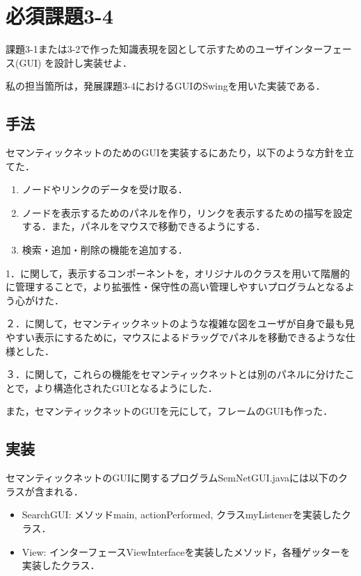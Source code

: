 \documentclass[12pt]{jarticle}
\begin{document}
\section{必須課題3-4}
\begin{screen}
課題3-1または3-2で作った知識表現を図として示すためのユーザインターフェース(GUI) を設計し実装せよ．
\end{screen}
私の担当箇所は，発展課題3-4におけるGUIのSwingを用いた実装である．

\subsection{手法}
セマンティックネットのためのGUIを実装するにあたり，以下のような方針を立てた．
\begin{enumerate}
\item ノードやリンクのデータを受け取る．
\item ノードを表示するためのパネルを作り，リンクを表示するための描写を設定する．また，パネルをマウスで移動できるようにする．
\item 検索・追加・削除の機能を追加する．
\end{enumerate}

1．に関して，表示するコンポーネントを，オリジナルのクラスを用いて階層的に管理することで，より拡張性・保守性の高い管理しやすいプログラムとなるよう心がけた．

２．に関して，セマンティックネットのような複雑な図をユーザが自身で最も見やすい表示にするために，マウスによるドラッグでパネルを移動できるような仕様とした．

３．に関して，これらの機能をセマンティックネットとは別のパネルに分けたことで，より構造化されたGUIとなるようにした．

また，セマンティックネットのGUIを元にして，フレームのGUIも作った．

\clearpage

\subsection{実装}
セマンティックネットのGUIに関するプログラムSemNetGUI.javaには以下のクラスが含まれる．
\begin{itemize}
\item SearchGUI: メソッドmain, actionPerformed, クラスmyListenerを実装したクラス．
\item View: インターフェースViewInterfaceを実装したメソッド，各種ゲッターを実装したクラス．
\end{itemize}
\end{document}
